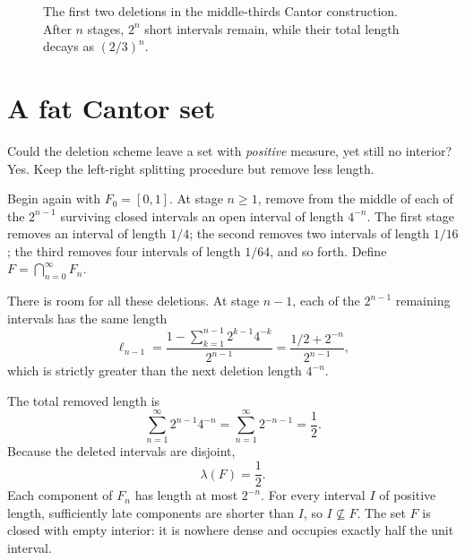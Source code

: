 \begin{figure}[htbp]
\centering
{}
\caption{The first two deletions in the middle-thirds Cantor construction. After \(n\) stages, \(2^n\) short intervals remain, while their total length decays as \((2/3)^n\).}
\label{fig:N20261020-cantor}
\end{figure}

\section{A fat Cantor set}

Could the deletion scheme leave a set with \emph{positive} measure, yet still no interior? Yes. Keep the left-right splitting procedure but remove less length.

Begin again with \(F_0=[0,1]\). At stage \(n\geq1\), remove from the middle of each of the \(2^{n-1}\) surviving closed intervals an open interval of length \(4^{-n}\). The first stage removes an interval of length \(1/4\); the second removes two intervals of length \(1/16\); the third removes four intervals of length \(1/64\), and so forth. Define \(F=\bigcap_{n=0}^\infty F_n\).

There is room for all these deletions. At stage \(n-1\), each of the \(2^{n-1}\) remaining intervals has the same length
\[
 \ell_{n-1}
 =\frac{1-\sum_{k=1}^{n-1}2^{k-1}4^{-k}}{2^{n-1}}
 =\frac{1/2+2^{-n}}{2^{n-1}},
\]
which is strictly greater than the next deletion length \(4^{-n}\).

The total removed length is
\[
 \sum_{n=1}^\infty2^{n-1}4^{-n}
 =\sum_{n=1}^\infty2^{-n-1}=\frac12.
\]
Because the deleted intervals are disjoint,
\[
 \boxed{\lambda(F)=\frac12}.
\]
Each component of \(F_n\) has length at most \(2^{-n}\). For every interval \(I\) of positive length, sufficiently late components are shorter than \(I\), so \(I\not\subseteq F\). The set \(F\) is closed with empty interior: it is nowhere dense and occupies exactly half the unit interval.

